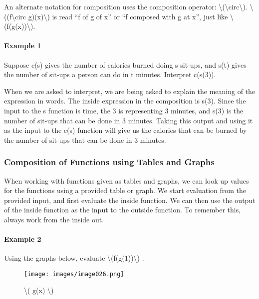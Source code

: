 An alternate notation for composition uses the composition operator:
\textbackslash{}(\textbackslash{}circ\textbackslash{}).
\textbackslash{}((f\textbackslash{}circ g)(x)\textbackslash{}) is read
``f of g of x'' or ``f composed with g at x'', just like
\textbackslash{}(f(g(x))\textbackslash{}).

\hypertarget{example-1}{%
\paragraph{Example 1}\label{example-1}}

Suppose c(s) gives the number of calories burned doing s sit-ups, and
s(t) gives the number of sit-ups a person can do in t minutes. Interpret
c(s(3)).

When we are asked to interpret, we are being asked to explain the
meaning of the expression in words. The inside expression in the
composition is s(3). Since the input to the s function is time, the 3 is
representing 3 minutes, and s(3) is the number of sit-ups that can be
done in 3 minutes. Taking this output and using it as the input to the
c(s) function will give us the calories that can be burned by the number
of sit-ups that can be done in 3 minutes.

\hypertarget{composition-of-functions-using-tables-and-graphs}{%
\subsubsection{Composition of Functions using Tables and
Graphs}\label{composition-of-functions-using-tables-and-graphs}}

When working with functions given as tables and graphs, we can look up
values for the functions using a provided table or graph. We start
evaluation from the provided input, and first evaluate the inside
function. We can then use the output of the inside function as the input
to the outside function. To remember this, always work from the inside
out.

\hypertarget{example-2}{%
\paragraph{Example 2}\label{example-2}}

Using the graphs below, evaluate
\textbackslash{}(f(g(1))\textbackslash{}) .

\begin{figure}
\centering
\texttt{[image: images/image026.png]}
\caption{\textbackslash{}( g(x) \textbackslash{})}
\end{figure}

